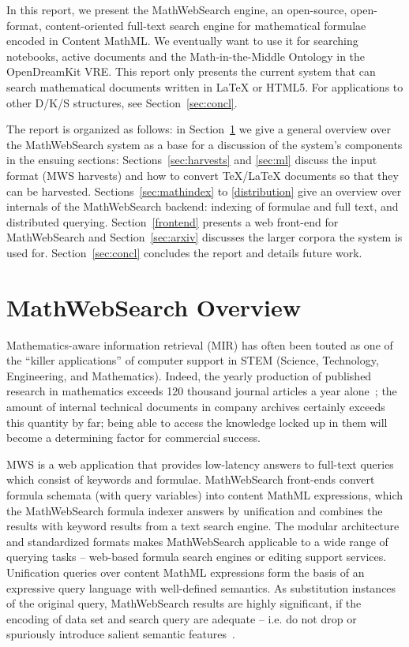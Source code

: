 \documentclass{deliverablereport}
\def\pn{OpenDreamKit\xspace}
\def\MWS{\textsf{MathWebSearch}\xspace}
\begin{document}
In this report, we present the \MWS engine, an open-source, open-format,
content-oriented full-text search engine for mathematical formulae encoded in Content
MathML. We eventually want to use it for searching notebooks, active documents and the
Math-in-the-Middle Ontology in the \pn VRE. This report only presents the current system
that can search mathematical documents written in {\LaTeX} or HTML5. For applications to
other D/K/S structures, see Section~\ref{sec:concl}.
 
The report is organized as follows: in Section~\ref{sec:mws} we give a general overview
over the \MWS system as a base for a discussion of the system's components in the
ensuing sections: Sections~\ref{sec:harvests} and \ref{sec:ml} discuss the input format
(MWS harvests) and how to convert {\TeX/\LaTeX} documents so that they can be
harvested. Sections~\ref{sec:mathindex} to \ref{distribution} give an overview over
internals of the \MWS backend: indexing of formulae and full text, and
distributed querying. Section~\ref{frontend} presents a web front-end for \MWS
and Section~\ref{sec:arxiv} discusses the larger corpora the system is used for.
Section~\ref{sec:concl} concludes the report and details future work.

\section{\MWS Overview}\label{sec:mws}

Mathematics-aware information retrieval (MIR) has often been touted as one of the “killer
applications” of computer support in STEM (Science, Technology, Engineering, and
Mathematics). Indeed, the yearly production of published research in mathematics exceeds
120 thousand journal articles a year alone~\cite{KohProHam:ntcir11}; the amount of
internal technical documents in company archives certainly exceeds this quantity by far;
being able to access the knowledge locked up in them will become a determining factor for
commercial success.

MWS is a web application that provides low-latency answers to full-text queries which
consist of keywords and formulae. \MWS front-ends convert formula schemata (with query
variables) into content MathML expressions, which the \MWS formula indexer answers by
unification and combines the results with keyword results from a text search engine. The
modular architecture and standardized formats makes \MWS applicable to a wide range of
querying tasks – web-based formula search engines or editing support services. Unification
queries over content MathML expressions form the basis of an expressive query language
with well-defined semantics. As substitution instances of the original query, \MWS results
are highly significant, if the encoding of data set and search query are adequate –
i.e. do not drop or spuriously introduce salient semantic
features~\cite{KohProHam:ntcir11}.
\end{document}
